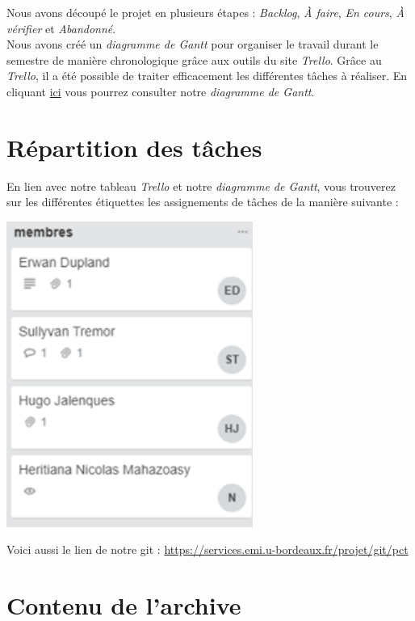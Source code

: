 \documentclass[12]{report}
\begin{document}
  Nous avons découpé le projet en plusieurs étapes : \emph{Backlog}, \emph{À faire}, \emph{En cours}, \emph{À vérifier} et \emph{Abandonné}. \\

  Nous avons créé un \emph{diagramme de Gantt} pour organiser le travail durant le semestre de manière chronologique grâce aux outils du site \emph{Trello}.
  Grâce au \emph{Trello}, il a été possible de traiter efficacement les différentes tâches à réaliser.
  En cliquant \href{Gantt.pdf}{ici} vous pourrez consulter notre \emph{diagramme de Gantt}.

 \section{Répartition des tâches}

  En lien avec notre tableau \emph{Trello} et notre \emph{diagramme de Gantt}, vous trouverez sur les différentes étiquettes les assignements de tâches de la manière suivante :

  \begin{center}
  \includegraphics[height=10cm]{membres.png}
  \end{center}
  Voici aussi le lien de notre git : \href{https://services.emi.u-bordeaux.fr/projet/git/pct}{https://services.emi.u-bordeaux.fr/projet/git/pct}
  \newpage
  \section{Contenu de l'archive}
\end{document}
